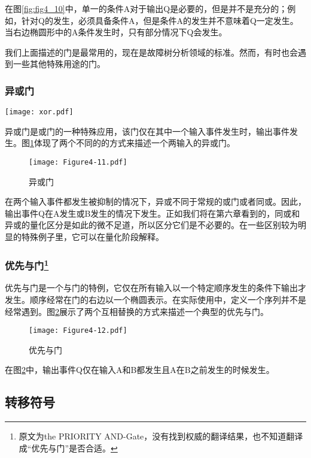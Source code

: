 \documentclass[cn,11pt,chinese]{elegantbook}
\begin{document}
在图\ref{fig:fig4_10}中，单一的条件A对于输出Q是必要的，但是并不是充分的；例如，针对Q的发生，必须具备条件A，但是条件A的发生并不意味着Q一定发生。当右边椭圆形中的A条件发生时，只有部分情况下Q会发生。

我们上面描述的门是最常用的，现在是故障树分析领域的标准。然而，有时也会遇到一些其他特殊用途的门。

\subsubsection{异或门}

\texttt{[image: xor.pdf]}

异或门是或门的一种特殊应用，该门仅在其中一个输入事件发生时，输出事件发生。图\ref{fig:fig4_11}体现了两个不同的的方式来描述一个两输入的异或门。

\begin{figure}[H]
	\centering
	\texttt{[image: Figure4-11.pdf]}
	\caption{异或门}\label{fig:fig4_11}
\end{figure}

在两个输入事件都发生被抑制的情况下，异或不同于常规的或门或者同或。因此，输出事件Q在A发生或B发生的情况下发生。正如我们将在第六章看到的，同或和异或的量化区分是如此的微不足道，所以区分它们是不必要的。在一些区别较为明显的特殊例子里，它可以在量化阶段解释。

\subsubsection{优先与门\footnote{原文为the PRIORITY AND-Gate，没有找到权威的翻译结果，也不知道翻译成“优先与门”是否合适。}} 



优先与门是一个与门的特例，它仅在所有输入以一个特定顺序发生的条件下输出才发生。顺序经常在门的右边以一个椭圆表示。在实际使用中，定义一个序列并不是经常遇到。图\ref{fig:fig4_12}展示了两个互相替换的方式来描述一个典型的优先与门。

\begin{figure}[h]
	\centering
	\texttt{[image: Figure4-12.pdf]}
	\caption{优先与门}\label{fig:fig4_12}
\end{figure}

在图\ref{fig:fig4_12}中，输出事件Q仅在输入A和B都发生且A在B之前发生的时候发生。

\subsection{转移符号}
\end{document}
